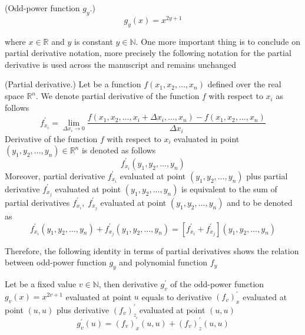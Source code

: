 \begin{definition}(Odd-power function $g_y$.)
    \begin{equation}
        g_{y}(x) = x^{2y + 1}
        \label{eq:definition-g}
    \end{equation}
\end{definition}
where $x\in \mathbb{R}$ and $y$ is constant $y\in \mathbb{N}$.
One more important thing is to conclude on partial derivative notation,
more precisely the following notation for the partial derivative is used across the manuscript and remains unchanged
\begin{notation} (Partial derivative.)
    Let be a function $f(x_1, x_2, \dots, x_n)$ defined over the real space $\mathbb{R}^n$.
    We denote partial derivative of the function $f$ with respect to $x_i$ as follows
    \begin{equation*}
        f^{'}_{x_i} = \lim_{\Delta x_i \to 0} \frac{f(x_1, x_2, \dots, x_i + \Delta x_i, \dots, x_n) - f(x_1, x_2, \dots, x_n)}{\Delta x_i}
    \end{equation*}
    Derivative of the function $f$ with respect to $x_i$
    evaluated in point $(y_1, y_2, \dots, y_n) \in \mathbb{R}^n$ is denoted as follows
    \begin{equation*}
        f^{'}_{x_i} (y_1, y_2, \dots, y_n)
    \end{equation*}
    Moreover, partial derivative $f^{'}_{x_i}$ evaluated at point $(y_1, y_2, \dots, y_n)$ plus
    partial derivative $f^{'}_{x_j}$ evaluated at point $(y_1, y_2, \dots, y_n)$
    is equivalent to the sum of partial derivatives $f^{'}_{x_i}, \; f^{'}_{x_j}$
    evaluated at point $(y_1, y_2, \dots, y_n)$ and to be denoted as
    \begin{equation*}
        f^{'}_{x_i} (y_1, y_2, \dots, y_n) + f^{'}_{x_j} (y_1, y_2, \dots, y_n) = [f^{'}_{x_i} + f^{'}_{x_j}] (y_1, y_2, \dots, y_n)
    \end{equation*}
\end{notation}
Therefore, the following identity in terms of partial derivatives shows the relation between odd-power function $g_{y}$ and
polynomial function $f_{y}$
\begin{thm}
    Let be a fixed value $v\in \mathbb{N}$, then derivative $g_v^{'}$ of the odd-power function $g_v(x) = x^{2v + 1}$
    evaluated at point $u$ equals to derivative $(f_{v})^{'}_{x}$ evaluated at point $(u, u)$ plus
    derivative $(f_{v})^{'}_{z}$ evaluated at point $(u, u)$
    \begin{equation}
        g_v^{'} (u) = (f_{v})^{'}_{x} (u, u) + (f_{v})^{'}_{z} (u, u)
        \label{eq:odd-exponential-identity}
    \end{equation}
\end{thm}
